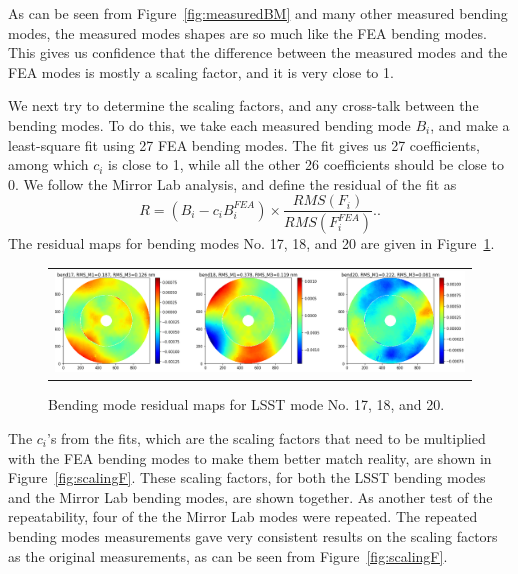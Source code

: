 \documentclass [twoside,openbib,12pt]{article}
\newcommand{\beq}{\begin{equation}}
\newcommand{\eeq}{\end{equation}}
\begin{document}
As can be seen from Figure~\ref{fig:measuredBM} and many other
measured bending modes, the measured modes shapes are so much like the
FEA bending modes. This gives us confidence that the difference
between the measured modes and the FEA modes is mostly a scaling
factor, and it is very close to 1.

We next try to determine the scaling factors, and any cross-talk
between the bending modes. To do this, we take each measured bending
mode $B_i$, and make a least-square fit using 27 FEA bending modes. The fit
gives us 27 coefficients, among which $c_i$ is close to 1, while all
the other 26 coefficients should be close to 0.
We follow the Mirror Lab analysis, and define the residual of the fit as
\beq
R = (B_i - c_i B_i^{FEA}) \times
      \frac{RMS(F_i)}{RMS(F_i^{FEA})}..
\eeq
The residual maps for bending modes No. 17, 18, and 20 are given in Figure~\ref{fig:residualBM}.

 \begin{figure}[bthp]
   \begin{center}
     \begin{tabular}{c}
\includegraphics[width=150mm]{figures/residualBM.png}
  \end{tabular}
   \end{center}
   \caption
  { \label{fig:residualBM}
Bending mode residual maps for LSST mode No. 17, 18, and 20.
 }
\end{figure}

The $c_i$'s from the fits, which are the scaling factors that need to
be multiplied with the FEA bending modes to make them better match reality,
are shown in Figure~\ref{fig:scalingF}.
These scaling factors, for both the LSST bending modes and the Mirror
Lab bending modes, are shown together.
As another test of the repeatability, four of the the Mirror Lab modes
were repeated. The repeated bending modes measurements gave very
consistent results on the scaling factors as the original
measurements, as can be seen from Figure~\ref{fig:scalingF}.
\end{document}
